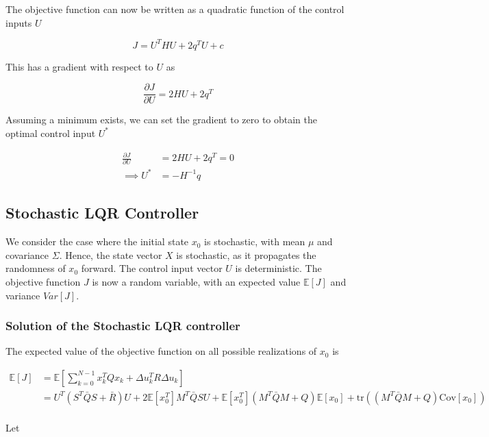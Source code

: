 \documentclass{article}
\begin{document}
The objective function can now be written as a quadratic function of the control inputs $U$

$$
J = U^T H U + 2 q^T U + c
$$

This has a gradient with respect to $U$ as

$$
\frac{\partial J}{\partial U} = 2 H U + 2 q^T
$$

Assuming a minimum exists, we can set the gradient to zero to obtain the optimal control input $U^*$

\begin{equation}
  \begin{aligned}
    \frac{\partial J}{\partial U} &= 2 H U + 2 q^T = 0 \\
    \implies U^* &= -H^{-1} q
  \end{aligned}
\end{equation}

\subsection{Stochastic LQR Controller} \label{lqr_ctrl_stoch}

We consider the case where the initial state $x_0$ is stochastic, with mean $\mu$ and covariance $\Sigma$.
Hence, the state vector $X$ is stochastic, as it propagates the randomness of $x_0$ forward.
The control input vector $U$ is deterministic. The objective function $J$ is now a random variable,
with an expected value $\mathbb{E}[J]$ and variance $Var[J]$.

\subsubsection{Solution of the Stochastic LQR controller}

The expected value of the objective function on all possible realizations of $x_0$ is

\begin{equation}
  \begin{aligned}
    \mathbb{E}[J] &= \mathbb{E}[\sum_{k=0}^{N-1} x_k^T Q x_k + \Delta u_k^T R \Delta u_k] \\
    &= U^T (S^T \bar{Q} S + \bar{R}) U + 2 \mathbb{E}[x_0^T] M^T \bar{Q} S U + \mathbb{E}[x_0^T] (M^T \bar{Q} M + Q) \mathbb{E}[x_0] + \text{tr}((M^T \bar{Q} M + Q) \text{Cov}[x_0]) \\
  \end{aligned}
\end{equation}

Let
\end{document}
